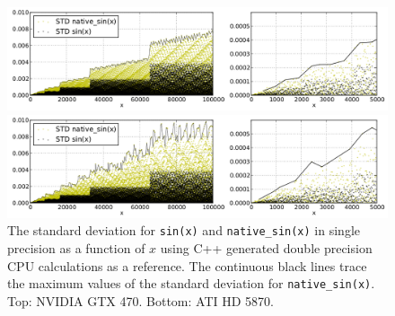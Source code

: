 \documentclass[11pt,twoside]{report}
\begin{document}
\begin{figure}[htbp]
	\vspace{-5pt}
	\begin{center}
		\includegraphics[width=\textwidth]{img/NVIDIA_native_functions_MSE.png}		

		\includegraphics[width=\textwidth]{img/ATI_native_functions_MSE.png}		
	\end{center}
	\vspace{-10pt}
	\caption{The standard deviation for {\tt sin(x)} and {\tt native\_sin(x)} in single precision as a function of $x$ using C++ generated  double precision CPU calculations as a reference. The continuous black lines trace the maximum values of the standard deviation for {\tt native\_sin(x)}. Top: NVIDIA GTX 470.  Bottom: ATI HD 5870.}
	\label{fig:native_functions_STD}
\end{figure}







%
\end{document}
